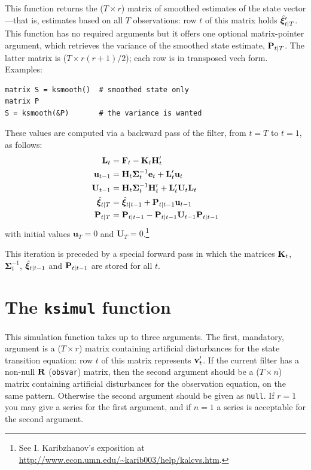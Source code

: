 \documentclass[a4paper]{article}
\newcommand{\obsmat}{\ensuremath\mathbf{H}}
\newcommand{\obsvar}{\ensuremath\mathbf{R}}
\newcommand{\statevec}{\ensuremath\mathbf{\bm \xi}}
\newcommand{\statemat}{\ensuremath\mathbf{F}}
\newcommand{\strdist}{\ensuremath\mathbf{v}}
\newcommand{\statevar}{\ensuremath\mathbf{P}}
\newcommand{\gain}{\ensuremath\mathbf{K}}
\newcommand{\prederr}{\ensuremath\mathbf{e}}
\newcommand{\predvar}{\ensuremath{\bm\Sigma}}
\begin{document}
This function returns the ($T \times r$) matrix of smoothed estimates
of the state vector---that is, estimates based on all $T$
observations: row $t$ of this matrix holds $\hat{\statevec}_{t|T}'$.  This
function has no required arguments but it offers one optional
matrix-pointer argument, which retrieves the variance of the smoothed
state estimate, $\statevar_{t|T}$.  The latter matrix is ($T \times
r(r+1)/2$); each row is in transposed vech form.  Examples:
%
\begin{verbatim}
matrix S = ksmooth()  # smoothed state only
matrix P
S = ksmooth(&P)       # the variance is wanted
\end{verbatim}

These values are computed via a backward pass of the filter, from
$t = T$ to $t = 1$, as follows:
%
\begin{align*}
\mathbf{L}_t &= \statemat_t - \gain_t \obsmat_t' \\
\mathbf{u}_{t-1} &= \obsmat_t \predvar_t^{-1} \prederr_t 
 + \mathbf{L}_t' \mathbf{u}_t \\
\mathbf{U}_{t-1} &= \obsmat_t \predvar_t^{-1} \obsmat_t' + 
  \mathbf{L}_t' \mathbf{U}_t \mathbf{L}_t \\
\hat{\statevec}_{t|T} &= \hat{\statevec}_{t|t-1} + 
  \statevar_{t|t-1} \mathbf{u}_{t-1} \\
\statevar_{t|T} &= \statevar_{t|t-1} - 
  \statevar_{t|t-1} \mathbf{U}_{t-1} \statevar_{t|t-1}
\end{align*}
%
with initial values $\mathbf{u}_T = 0$ and $\mathbf{U}_T =
0$.\footnote{See I. Karibzhanov's exposition at
\url{http://www.econ.umn.edu/~karib003/help/kalcvs.htm}.}

This iteration is preceded by a special forward pass in which the
matrices $\gain_t$, $\predvar_t^{-1}$, $\hat{\statevec}_{t|t-1}$ and
$\statevar_{t|t-1}$ are stored for all $t$.


\section{The \texttt{ksimul} function}

This simulation function takes up to three arguments.  The first,
mandatory, argument is a ($T \times r$) matrix containing artificial
disturbances for the state transition equation: row $t$ of this matrix
represents $\strdist_t'$.  If the current filter has a non-null
$\obsvar$ (\texttt{obsvar}) matrix, then the second argument should be
a ($T \times n$) matrix containing artificial disturbances for the
observation equation, on the same pattern.  Otherwise the second
argument should be given as \texttt{null}.  If $r=1$ you may give a
series for the first argument, and if $n=1$ a series is acceptable for
the second argument.
\end{document}

